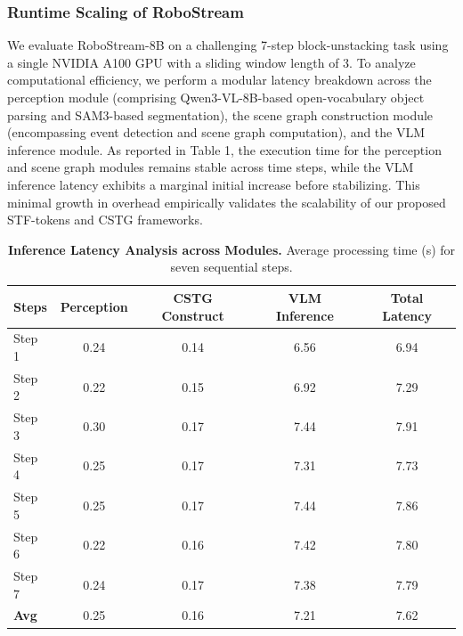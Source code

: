 \subsubsection{Runtime Scaling of RoboStream}
We evaluate RoboStream-8B on a challenging 7-step block-unstacking task using a single NVIDIA A100 GPU with a sliding window length of 3. To analyze computational efficiency, we perform a modular latency breakdown across the perception module (comprising Qwen3-VL-8B-based open-vocabulary object parsing and SAM3-based segmentation), the scene graph construction module (encompassing event detection and scene graph computation), and the VLM inference module. As reported in Table 1, the execution time for the perception and scene graph modules remains stable across time steps, while the VLM inference latency exhibits a marginal initial increase before stabilizing. This minimal growth in overhead empirically validates the scalability of our proposed STF-tokens and CSTG frameworks.
\begin{table}[h]
\centering
\caption{\textbf{Inference Latency Analysis across Modules.} Average processing time (s) for seven sequential steps. }
\label{tab:latency_breakdown}
\begin{tabular*}{\textwidth}{@{\extracolsep{\fill}} l cccc @{}}
\toprule
\textbf{Steps} & 
\textbf{Perception} & 
\textbf{CSTG Construct} & 
\textbf{VLM Inference} & 
\textbf{Total Latency} \\
\midrule
Step 1 & 0.24 & 0.14 & 6.56 & 6.94 \\
Step 2 & 0.22 & 0.15 & 6.92 & 7.29 \\
Step 3 & 0.30 & 0.17 & 7.44 & 7.91 \\
Step 4 & 0.25 & 0.17 & 7.31 & 7.73 \\
Step 5 & 0.25 & 0.17 & 7.44 & 7.86 \\
Step 6 & 0.22 & 0.16 & 7.42 & 7.80 \\
Step 7 & 0.24 & 0.17 & 7.38 & 7.79 \\
\midrule
\textbf{Avg} & 0.25 & 0.16 & 7.21 & 7.62 \\
\bottomrule
\end{tabular*}
\end{table}

